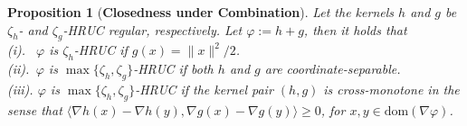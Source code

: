 \documentclass[10pt,a4paper]{amsart}
\newtheorem{proposition}{Proposition}
\newcommand{\dom}[1]{\mathrm{dom}(#1)}
\begin{document}
\begin{proposition}[\textbf{Closedness under Combination}]
    \label{proposition:Affine 1} 
    Let the kernels $h$ and $g$ be $\zeta_h$- and $\zeta_g$-HRUC regular, respectively. Let $\varphi:= h+ g$, then it holds that  \vspace{0.1cm}\\
    \noindent\emph{(i).} $\,\,\,\varphi$ is $\zeta_h$-HRUC if $g(x) = \|x\|^2/2$.\vspace{0.1cm}\\
    \noindent\emph{(ii).} $\,\varphi$ is $\max\{\zeta_h,\zeta_g\}$-HRUC if both $h$ and $g$ are coordinate-separable.\vspace{0.1cm}\\
    \noindent\emph{(iii).} $\!\varphi$ is $\max\{\zeta_h,\zeta_g\}$-HRUC if the kernel pair $(h,g)$ is cross-monotone in the sense that 
    $\langle \nabla h(x)-\nabla h(y),  \nabla g(x)-\nabla g(y)\rangle \geq 0$,  for $x,y\in\dom{\nabla\varphi}$.
\end{proposition}
\end{document}
